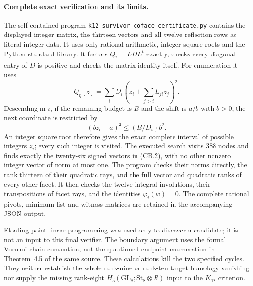 \paragraph{Complete exact verification and its limits.}
The self-contained program
\texttt{k12\_survivor\_coface\_certificate.py} contains the displayed
integer matrix, the thirteen vectors and all twelve reflection
rows as literal integer data. It uses only rational arithmetic,
integer square roots and the Python standard library.
It factors $Q_\eta=L D L^t$ exactly, checks every diagonal entry
of $D$ is positive and checks the matrix identity itself.
For enumeration it uses
\[
 Q_\eta[z]=\sum_i D_i
       \left(z_i+\sum_{j>i}L_{ji}z_j\right)^2.
\]
Descending in $i$, if the remaining budget is $B$ and the shift
is $a/b$ with $b>0$, the next coordinate is restricted by
\[
 (b z_i+a)^2\le (B/D_i)b^2.
\]
An integer square root therefore gives the exact complete
interval of possible integers $z_i$; every such integer is
visited. The executed search visits $388$ nodes and finds
exactly the twenty-six signed vectors in (CB.2), with no
other nonzero integer vector of norm at most one.
The program checks their norms directly, the rank thirteen of
their quadratic rays, and the full vector and quadratic ranks
of every other facet. It then checks the twelve integral
involutions, their transpositions of facet rays, and the
identities $\varphi_i(w)=0$. The complete rational pivots,
minimum list and witness matrices are retained in the
accompanying JSON output.

Floating-point linear programming was used only to discover a
candidate; it is not an input to this final verifier. The boundary
argument uses the formal Voronoi chain convention, not the
questioned endpoint enumeration in Theorem~4.5 of the same
source. These calculations kill the two specified cycles.
They neither establish the whole rank-nine or rank-ten target
homology vanishing nor supply the missing rank-eight
$H_5(\mathrm{GL}_8;\mathrm{St}_8\otimes R)$ input to the
$K_{12}$ criterion.
